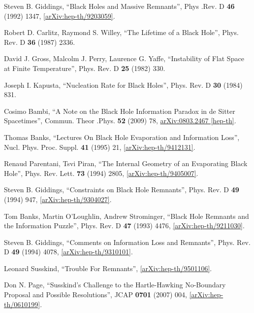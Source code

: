 \documentclass[12pt]{article}
\newcommand{\2}{$^2$}
\newcommand{\3}{$^3$}
\newcommand{\4}{$_4$}
\newcommand{\5}{$_5$}
\begin{document}
\begin{thebibliography}{400}
 Steven B. Giddings, ``Black Holes and Massive Remnants'', Phys .Rev. D \textbf{46} (1992) 1347, \href{http://arxiv.org/abs/hep-th/9203059}{[arXiv:hep-th/9203059]}.

Robert D. Carlitz, Raymond S. Willey, ``The Lifetime of a Black Hole'', Phys. Rev. D \textbf{36} (1987) 2336.

David J. Gross, Malcolm J. Perry, Laurence G. Yaffe, ``Instability of Flat Space at Finite Temperature'', Phys. Rev. D \textbf{25} (1982) 330.

Joseph I. Kapusta, ``Nucleation Rate for Black Holes'', Phys. Rev. D \textbf{30} (1984) 831.  

Cosimo Bambi, ``A Note on the Black Hole Information Paradox in de Sitter Spacetimes'', 	Commun. Theor .Phys. \textbf{52} (2009) 78, \href{http://arxiv.org/abs/0803.2467}{arXiv:0803.2467 [hep-th]}.

 Thomas Banks, ``Lectures On Black Hole Evaporation and Information Loss'', Nucl. Phys. Proc. Suppl. \textbf{41} (1995) 21, \href{http://arxiv.org/abs/hep-th/9412131}{[arXiv:hep-th/9412131]}.

Renaud Parentani, Tsvi Piran, ``The Internal Geometry of an Evaporating Black Hole'', Phys. Rev. Lett. \textbf{73} (1994) 2805, \href{http://arxiv.org/abs/hep-th/9405007v2}{[arXiv:hep-th/9405007]}.


 Steven B. Giddings, ``Constraints on Black Hole Remnants'', Phys. Rev. D \textbf{49} (1994) 947, \href{http://arxiv.org/abs/hep-th/9304027}{[arXiv:hep-th/9304027]}.


Tom Banks, Martin O'Loughlin, Andrew Strominger, ``Black Hole Remnants and the Information Puzzle'', Phys. Rev. D \textbf{47} (1993) 4476, \href{http://arxiv.org/abs/hep-th/9211030}{[arXiv:hep-th/9211030]}. 

Steven B. Giddings, ``Comments on Information Loss and Remnants'', Phys. Rev. D \textbf{49} (1994) 4078, \href{http://arxiv.org/abs/hep-th/9310101}{[arXiv:hep-th/9310101]}.

Leonard Susskind, ``Trouble For Remnants'', \href{http://arxiv.org/abs/hep-th/9501106v1}{[arXiv:hep-th/9501106]}. 

Don N. Page, ``Susskind's Challenge to the Hartle-Hawking No-Boundary Proposal and Possible Resolutions'', JCAP \textbf{0701} (2007) 004, \href{http://arxiv.org/abs/hep-th/0610199}{[arXiv:hep-th/0610199]}.


\end{thebibliography}
\end{document}
